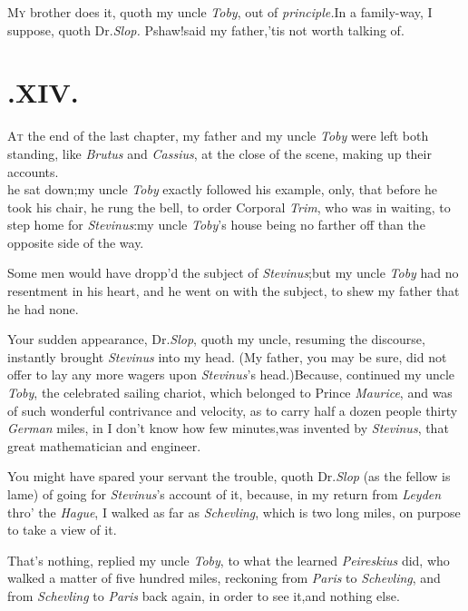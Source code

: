 \documentclass{article}
\begin{document}
\lettrine{M}{y} brother does it, quoth my uncle
\textit{Toby}, out of \textit{principle.}\tsh In a family-way,
I suppose, quoth Dr.\@ \textit{Slop.}\tsh\break
Pshaw!\tsk said my father,\tsk ’tis not worth\break
talking of.

\bigskip

\section{.\enspace  XIV.}

\lettrine{A}{t} the end of the last chapter, my\break
father and my uncle \textit{Toby} were left both standing, like
\textit{Brutus} and \textit{Cassius}, at the close of the scene, making
up their accounts.\\
\newpage
\noindent
{}\break
\tsk he sat down;\tsk my uncle \textit{Toby}
exactly followed his example, only, that before he took his chair, he rung the bell,
to order Corporal \textit{Trim}, who was in waiting, to step home for
\textit{Stevinus}:\tsk my uncle \textit{Toby}’s house being no farther off than the
opposite side of the way.

Some men would have dropp’d the subject of
\textit{Stevinus};\tsk but my uncle \textit{Toby} had no resentment
in his heart, and he went on with the subject, to shew my father
that he had none.

Your sudden appearance, Dr.\@ \textit{Slop},\break
quoth my uncle,
resuming the discourse, instantly brought \textit{Stevinus} into my
head. (My father, you may be sure, did not offer to lay any more
wagers upon \textit{Stevinus}’s head.)\tsh Because, continued my
uncle \textit{Toby}, the celebrated sailing chariot,
which belonged to Prince \textit{Maurice}, and was of such wonderful
contrivance and velocity, as to carry half a dozen people thirty
\textit{German} miles, in I don’t know how few
minutes,\tsh was invented by \textit{Stevinus}, that great
mathematician and engineer.

You might have spared your servant the trouble, quoth Dr.\@ \textit{Slop} (as the fellow is lame) of going for
\textit{Stevinus}’s account of it, because, in my return from
\textit{Leyden} thro’ the \textit{Hague}, I walked as far as
\textit{Schev\-ling}, which is two long miles, on
purpose\break 
to take a view of it.

\tsk That’s nothing, replied my uncle \textit{Toby}, to what the
learned \textit{Peireskius} did, who walked a matter of five hundred
miles, reckoning from \textit{Paris} to
\textit{Schevling}, and from
\textit{Schevling} to \textit{Paris} back again, in order to see
it,\tsk and nothing else.
\end{document}
